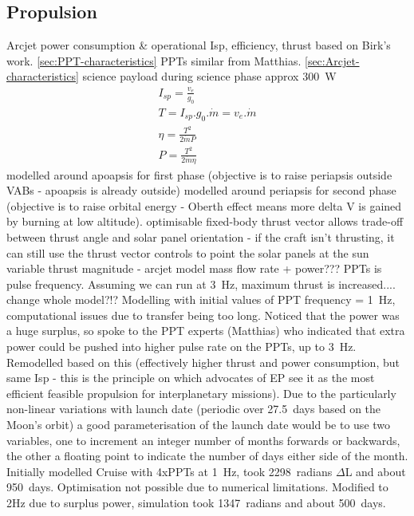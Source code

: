 \subsection{Propulsion}
Arcjet power consumption \& operational Isp, efficiency, thrust based on Birk's work. \autoref{sec:PPT-characteristics}
PPTs similar from Matthias. \autoref{sec:Arcjet-characteristics}
science payload during science phase approx 300~W \parencite{web_BW-1}
\begin{gather}
I_{sp} = \frac{v_e}{g_0} \\
T = I_{sp}.g_0.\dot{m} = v_e.\dot{m} \\
\eta = \frac{T^2}{2\dot{m}P} \\
P = \frac{T^2}{2\dot{m}\eta} 
\end{gather}
modelled around apoapsis for first phase (objective is to raise periapsis outside VABs - apoapsis is already outside)
modelled around periapsis for second phase (objective is to raise orbital energy - Oberth effect means more delta V is gained by burning at low altitude).
optimisable fixed-body thrust vector allows trade-off between thrust angle and solar panel orientation - if the craft isn't thrusting, it can still use the thrust vector controls to point the solar panels at the sun
variable thrust magnitude - arcjet model mass flow rate + power???
PPTs is pulse frequency. Assuming we can run at 3~Hz, maximum thrust is increased.... change whole model?!?
Modelling with initial values of PPT frequency = 1~Hz, computational issues due to transfer being too long. Noticed that the power was a huge surplus, so spoke to the PPT experts (Matthias) who indicated that extra power could be pushed into higher pulse rate on the PPTs, up to 3~Hz. Remodelled based on this (effectively higher thrust and power consumption, but same Isp - this is the principle on which advocates of EP see it as the most efficient feasible propulsion for interplanetary missions).
Due to the particularly non-linear variations with launch date (periodic over 27.5~days based on the Moon's orbit) a good parameterisation of the launch date would be to use two variables, one to increment an integer number of months forwards or backwards, the other a floating point to indicate the number of days either side of the month.
Initially modelled Cruise with 4xPPTs at 1~Hz, took 2298~radians $\Delta$L and about 950~days. Optimisation not possible due to numerical limitations. Modified to 2Hz due to surplus power, simulation took 1347~radians and about 500~days.
